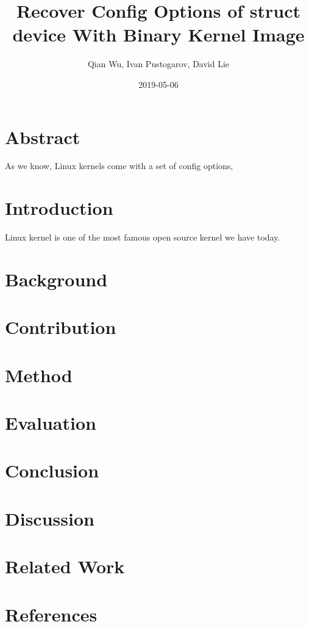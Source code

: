\documentclass{article}
\title{Recover Config Options of struct device With Binary Kernel Image}
\date{2019-05-06}
\author{Qian Wu, Ivan Pustogarov, David Lie}
\begin{document}
\maketitle

\section{Abstract}
As we know, Linux kernels come with a set of config options, 
\section{Introduction}
Linux kernel is one of the most famous open source kernel we have today.
\section{Background}
\section{Contribution}
\section{Method}
\section{Evaluation}
\section{Conclusion}
\section{Discussion}
\section{Related Work}
\section{References}
	
\end{document}
